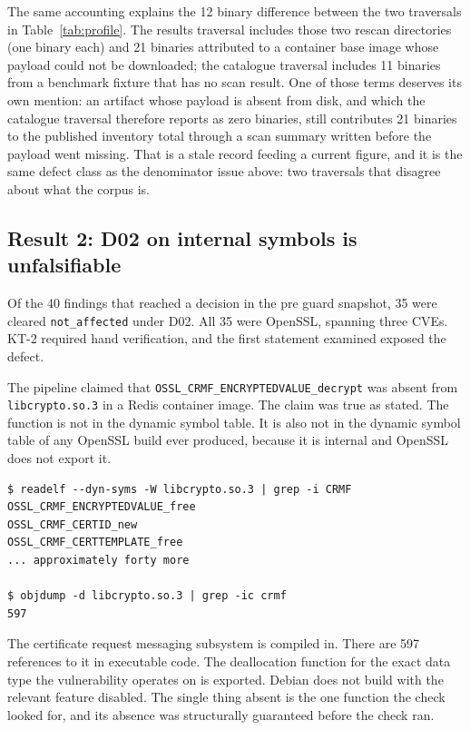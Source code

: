 The same accounting explains the 12 binary difference between the two traversals
in Table~\ref{tab:profile}. The results traversal includes those two rescan
directories (one binary each) and 21 binaries attributed to a container base
image whose payload could not be downloaded; the catalogue traversal includes 11
binaries from a benchmark fixture that has no scan result. One of those terms
deserves its own mention: an artifact whose payload is absent from disk, and
which the catalogue traversal therefore reports as zero binaries, still
contributes 21 binaries to the published inventory total through a scan summary
written before the payload went missing. That is a stale record feeding a
current figure, and it is the same defect class as the denominator issue above:
two traversals that disagree about what the corpus is.

\subsection{Result 2: D02 on internal symbols is unfalsifiable}
\label{sec:soundness}

Of the 40 findings that reached a decision in the pre guard snapshot, 35 were
cleared \texttt{not\_affected} under D02. All 35 were OpenSSL, spanning three
CVEs. KT-2 required hand verification, and the first statement examined exposed
the defect.

The pipeline claimed that \texttt{OSSL\_CRMF\_ENCRYPTEDVALUE\_decrypt} was absent
from \texttt{libcrypto.so.3} in a Redis container image. The claim was true as
stated. The function is not in the dynamic symbol table. It is also not in the
dynamic symbol table of any OpenSSL build ever produced, because it is internal
and OpenSSL does not export it.

\begin{lstlisting}
$ readelf --dyn-syms -W libcrypto.so.3 | grep -i CRMF
OSSL_CRMF_ENCRYPTEDVALUE_free
OSSL_CRMF_CERTID_new
OSSL_CRMF_CERTTEMPLATE_free
... approximately forty more

$ objdump -d libcrypto.so.3 | grep -ic crmf
597
\end{lstlisting}

The certificate request messaging subsystem is compiled in. There are 597
references to it in executable code. The deallocation function for the exact data
type the vulnerability operates on is exported. Debian does not build with the
relevant feature disabled. The single thing absent is the one function the check
looked for, and its absence was structurally guaranteed before the check ran.

